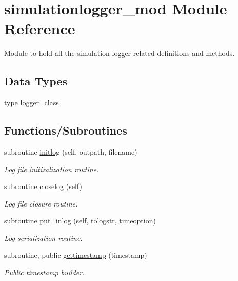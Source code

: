 \hypertarget{namespacesimulationlogger__mod}{}\section{simulationlogger\+\_\+mod Module Reference}
\label{namespacesimulationlogger__mod}


Module to hold all the simulation logger related definitions and methods.  


\subsection*{Data Types}
\begin{DoxyCompactItemize}
\item 
type \mbox{\hyperlink{structsimulationlogger__mod_1_1logger__class}{logger\+\_\+class}}
\end{DoxyCompactItemize}
\subsection*{Functions/\+Subroutines}
\begin{DoxyCompactItemize}
\item 
subroutine \mbox{\hyperlink{namespacesimulationlogger__mod_a7f4423ce42b0a9717110bd78028cec45}{initlog}} (self, outpath, filename)
\begin{DoxyCompactList}\small\item\em Log file initizalization routine. \end{DoxyCompactList}\item 
subroutine \mbox{\hyperlink{namespacesimulationlogger__mod_a9cad2fd4ad67dc229286f94b0444cb86}{closelog}} (self)
\begin{DoxyCompactList}\small\item\em Log file closure routine. \end{DoxyCompactList}\item 
subroutine \mbox{\hyperlink{namespacesimulationlogger__mod_a3bf437b875b454ef326a3bc660542539}{put\+\_\+inlog}} (self, tologstr, timeoption)
\begin{DoxyCompactList}\small\item\em Log serialization routine. \end{DoxyCompactList}\item 
subroutine, public \mbox{\hyperlink{namespacesimulationlogger__mod_abff1db7e1655cb59097146d78e650672}{gettimestamp}} (timestamp)
\begin{DoxyCompactList}\small\item\em Public timestamp builder. \end{DoxyCompactList}\end{DoxyCompactItemize}
